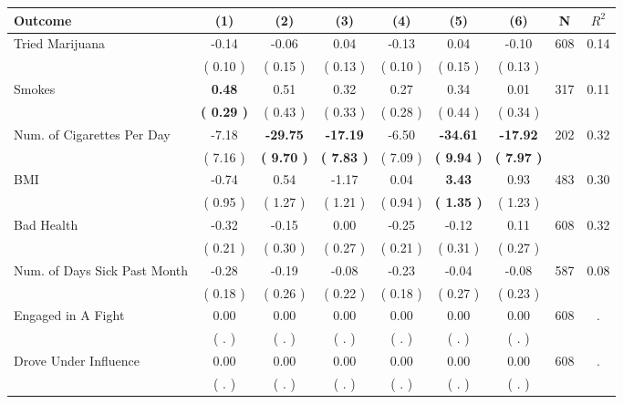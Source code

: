\begin{tabular}{lcccccccc}
\toprule
 \textbf{Outcome} & \textbf{(1)} & \textbf{(2)} & \textbf{(3)} & \textbf{(4)} & \textbf{(5)} & \textbf{(6)} & \textbf{N} & \textbf{$ R^2$} \\
\midrule
Tried Marijuana &     -0.14 &     -0.06 &      0.04 &     -0.13 &      0.04 &     -0.10 & 608 &       0.14 \\ 
 & (     0.10 ) & (     0.15 ) & (     0.13 ) & (     0.10 ) & (     0.15 ) & (     0.13 ) & \\
Smokes & \textbf{     0.48} &      0.51 &      0.32 &      0.27 &      0.34 &      0.01 & 317 &       0.11 \\ 
 & \textbf{(     0.29 )} & (     0.43 ) & (     0.33 ) & (     0.28 ) & (     0.44 ) & (     0.34 ) & \\
Num. of Cigarettes Per Day &     -7.18 & \textbf{   -29.75} & \textbf{   -17.19} &     -6.50 & \textbf{   -34.61} & \textbf{   -17.92} & 202 &       0.32 \\ 
 & (     7.16 ) & \textbf{(     9.70 )} & \textbf{(     7.83 )} & (     7.09 ) & \textbf{(     9.94 )} & \textbf{(     7.97 )} & \\
BMI &     -0.74 &      0.54 &     -1.17 &      0.04 & \textbf{     3.43} &      0.93 & 483 &       0.30 \\ 
 & (     0.95 ) & (     1.27 ) & (     1.21 ) & (     0.94 ) & \textbf{(     1.35 )} & (     1.23 ) & \\
Bad Health &     -0.32 &     -0.15 &      0.00 &     -0.25 &     -0.12 &      0.11 & 608 &       0.32 \\ 
 & (     0.21 ) & (     0.30 ) & (     0.27 ) & (     0.21 ) & (     0.31 ) & (     0.27 ) & \\
Num. of Days Sick Past Month &     -0.28 &     -0.19 &     -0.08 &     -0.23 &     -0.04 &     -0.08 & 587 &       0.08 \\ 
 & (     0.18 ) & (     0.26 ) & (     0.22 ) & (     0.18 ) & (     0.27 ) & (     0.23 ) & \\
Engaged in A Fight &      0.00 &      0.00 &      0.00 &      0.00 &      0.00 &      0.00 & 608 &          . \\ 
 & (        . ) & (        . ) & (        . ) & (        . ) & (        . ) & (        . ) & \\
Drove Under Influence &      0.00 &      0.00 &      0.00 &      0.00 &      0.00 &      0.00 & 608 &          . \\ 
 & (        . ) & (        . ) & (        . ) & (        . ) & (        . ) & (        . ) & \\

\end{tabular}
